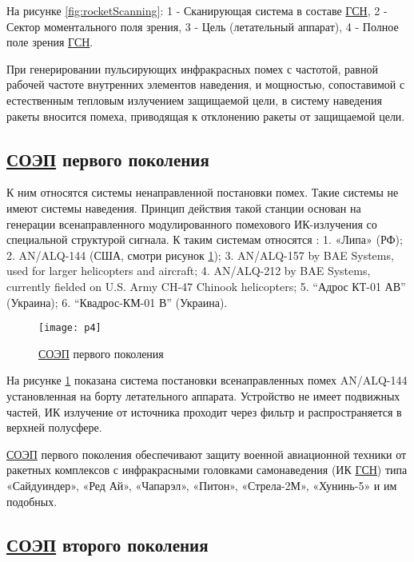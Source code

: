 На рисунке \ref{fig:rocketScanning}: 1 - Сканирующая система в составе \hyperref[acroGSN]{ГСН}, 2 - Сектор моментального поля зрения, 3 - Цель (летательный аппарат), 4 - Полное поле зрения \hyperref[acroGSN]{ГСН}.	
	
При генерировании пульсирующих инфракрасных помех с частотой, равной рабочей частоте внутренних элементов наведения, и мощностью, сопоставимой с естественным тепловым излучением защищаемой цели, в систему наведения ракеты вносится помеха, приводящая к отклонению ракеты от защищаемой цели. 

\subsection{ \hyperref[acroSOEP]{СОЭП} первого поколения}	

К ним относятся системы ненаправленной постановки помех. Такие системы не имеют системы наведения. Принцип действия такой станции основан на генерации всенаправленного модулированного помехового ИК-излучения со специальной структурой сигнала. К таким системам относятся \cite[]{SOEP_LIPA}: 1. «Липа» (РФ); 2. AN/ALQ-144 (США, смотри рисунок \ref{fig:alq}); 3. AN/ALQ-157 by BAE Systems, used for larger helicopters and aircraft; 4. AN/ALQ-212 by BAE Systems, currently fielded on U.S. Army CH-47 Chinook helicopters; 5. “Адрос КТ-01 АВ” (Украина); 6. “Квадрос-КМ-01 В” (Украина).

\begin{figure}[ht]
	\centering
	\texttt{[image: p4]} 
	\caption{ \hyperref[acroSOEP]{СОЭП} первого поколения}
	\label{fig:alq}
\end{figure}
На рисунке \ref{fig:alq} показана система постановки всенаправленных помех AN/ALQ-144 установленная на борту летательного аппарата. Устройство не имеет подвижных частей, ИК излучение от источника проходит через фильтр и распространяется в верхней полусфере.

 \hyperref[acroSOEP]{СОЭП} первого поколения обеспечивают защиту военной авиационной техники от ракетных комплексов с инфракрасными головками самонаведения (ИК \hyperref[acroGSN]{ГСН}) типа «Сайдуиндер», «Ред Ай», «Чапарэл», «Питон», «Стрела-2М», «Хунинь-5» и им подобных. 

\subsection{ \hyperref[acroSOEP]{СОЭП} второго поколения}	

